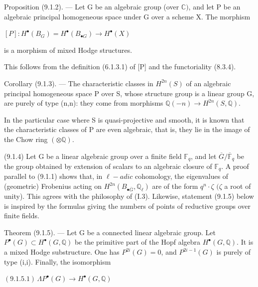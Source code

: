 \documentclass[11pt,twoside]{article}
\newcommand{\DFormula}[1]{%
  \par\smallskip\noindent\hspace*{0pt}\(\displaystyle #1\)\par\smallskip
}
\begin{document}
Proposition (9.1.2). — Let G be an algebraic group (over \(\mathbb{C})\), and let P be an algebraic principal homogeneous space under G over a scheme X. The morphism\par
\par\medskip
\DFormula{[P]:H^{\bullet }(B_{G})=H^{\bullet }(B_{\bullet G})\to H^{\bullet }(X)}
\par\medskip
is a morphism of mixed Hodge structures.\par
\par\medskip
This follows from the definition (6.1.3.1) of [P] and the functoriality (8.3.4).\par
\par\medskip
Corollary (9.1.3). — The characteristic classes in \(H^{2n}(S)\) of an algebraic principal homogeneous space P over S, whose structure group is a linear group G, are purely of type (n,n): they come from morphisms \(\mathbb{Q}(−n)\to H^{2n}(S,\mathbb{Q})\).\par
\par\medskip
In the particular case where S is quasi-projective and smooth, it is known that the characteristic classes of P are even algebraic, that is, they lie in the image of the Chow ring \((\otimes \mathbb{Q})\).\par
\par\medskip
(9.1.4) Let G be a linear algebraic group over a finite field \(𝔽_{q}\), and let \(\overline{G}/\overline{𝔽}_{q}\) be the group obtained by extension of scalars to an algebraic closure of \(𝔽_{q}\). A proof parallel to (9.1.1) shows that, in \(\ell -adic\) cohomology, the eigenvalues of (geometric) Frobenius acting on \(H^{2n}(B_{\bullet \overline{G}},\mathbb{Q}_{\ell })\) are of the form \(q^{n}·\zeta \) \((\zeta \) a root of unity). This agrees with the philosophy of (I.3). Likewise, statement (9.1.5) below is inspired by the formulas giving the numbers of points of reductive groups over finite fields.\par
\par\medskip
Theorem (9.1.5). — Let G be a connected linear algebraic group. Let \(P^{\bullet }(G)\subset H^{\bullet }(G,\mathbb{Q})\) be the primitive part of the Hopf algebra \(H^{\bullet }(G,\mathbb{Q})\). It is a mixed Hodge substructure. One has \(P^{2i}(G)=0\), and \(P^{2i−1}(G)\) is purely of type (i,i). Finally, the isomorphism\par
\par\medskip
\DFormula{(9.1.5.1)\,\Lambda P^{\bullet }(G)\to H^{\bullet }(G,\mathbb{Q})}
\par\medskip
\end{document}
